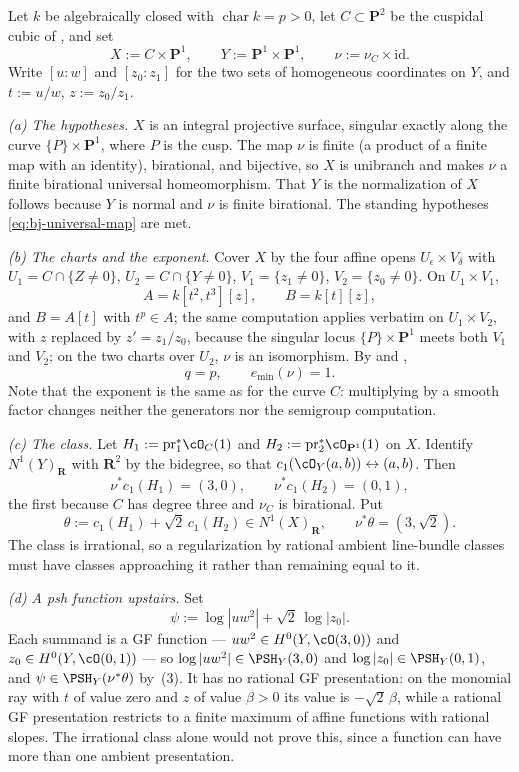 \begin{example}
\label{ex:ch43-surface-endtoend}
Let $k$ be algebraically closed with $\operatorname{char}k=p>0$, let
$C\subset\mathbf P^2$ be the cuspidal cubic of
, and set
\[
 X:=C\times\mathbf P^1,
 \qquad
 Y:=\mathbf P^1\times\mathbf P^1,
 \qquad
 \nu:=\nu_C\times\mathrm{id}.
\]
Write $[u:w]$ and $[z_0:z_1]$ for the two sets of homogeneous
coordinates on $Y$, and $t:=u/w$, $z:=z_0/z_1$.

\emph{(a) The hypotheses.}  $X$ is an integral projective surface, singular
exactly along the curve $\{P\}\times\mathbf P^1$, where $P$ is the cusp.
The map $\nu$ is finite (a product of a finite map with an identity),
birational, and bijective, so $X$ is unibranch and
 makes $\nu$ a finite
birational universal homeomorphism.  That $Y$ is the normalization of
$X$ follows because $Y$ is normal and $\nu$ is finite birational.  The
standing hypotheses \eqref{eq:bj-universal-map} are met.

\emph{(b) The charts and the exponent.}  Cover $X$ by the four affine
opens $U_\epsilon\times V_\delta$ with
$U_1=C\cap\{Z\ne0\}$, $U_2=C\cap\{Y\ne0\}$,
$V_1=\{z_1\ne0\}$, $V_2=\{z_0\ne0\}$.  On $U_1\times V_1$,
\[
 A=k[t^2,t^3][z],
 \qquad
 B=k[t][z],
\]
and $B=A[t]$ with $t^p\in A$; the same computation applies verbatim on
$U_1\times V_2$, with $z$ replaced by $z'=z_1/z_0$, because the
singular locus $\{P\}\times\mathbf P^1$ meets both $V_1$ and $V_2$;
on the two charts over $U_2$, $\nu$ is an isomorphism.  By  and
,
\[
 q=p,
 \qquad
 e_{\min}(\nu)=1 .
\]
Note that the exponent is the same as for the curve $C$: multiplying by a
smooth factor changes neither the generators nor the semigroup computation.

\emph{(c) The class.}  Let $H_1:=\mathrm{pr}_1^*\cO_C(1)$ and
$H_2:=\mathrm{pr}_2^*\cO_{\mathbf P^1}(1)$ on $X$.  Identify
$N^1(Y)_{\mathbf R}$ with $\mathbf R^2$ by the bidegree, so that
$c_1(\cO_Y(a,b))\leftrightarrow(a,b)$.  Then
\[
 \nu^*c_1(H_1)=(3,0),
 \qquad
 \nu^*c_1(H_2)=(0,1),
\]
the first because $C$ has degree three and $\nu_C$ is birational.  Put
\[
 \theta:=c_1(H_1)+\sqrt2\,c_1(H_2)\in N^1(X)_{\mathbf R},
 \qquad
 \nu^*\theta=(3,\sqrt2).
\]
The class is irrational, so a regularization by rational ambient
line-bundle classes must have classes approaching it rather than
remaining equal to it.

\emph{(d) A psh function upstairs.}  Set
\[
 \psi:=\log|uw^2|+\sqrt2\,\log|z_0| .
\]
Each summand is a GF function --- $uw^2\in H^0(Y,\cO(3,0))$ and
$z_0\in H^0(Y,\cO(0,1))$ --- so
$\log|uw^2|\in\PSH_Y(3,0)$ and $\log|z_0|\in\PSH_Y(0,1)$, and
$\psi\in\PSH_Y(\nu^*\theta)$ by
\,(3).
It has no rational GF presentation: on the monomial ray with
$t$ of value zero and $z$ of value $\beta>0$ its value is
$-\sqrt2\,\beta$, while a rational GF presentation restricts to a
finite maximum of affine functions with rational slopes.
The irrational class alone would not prove this, since a function can
have more than one ambient presentation.


\end{example}
